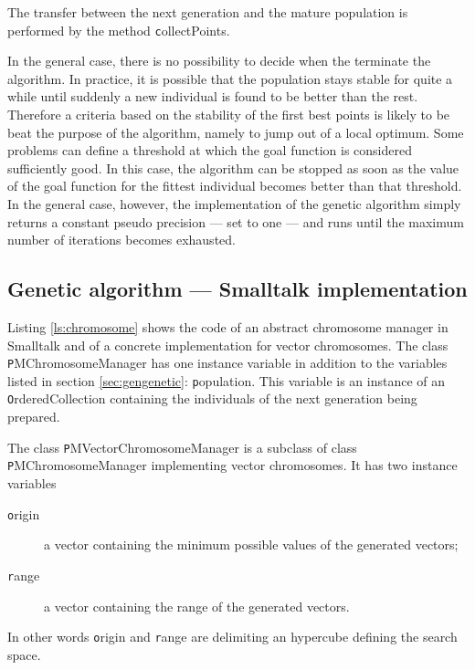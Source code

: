 \noindent The transfer between the next generation and the mature
population is performed by the method {\texttt collectPoints}.

In the general case, there is no possibility to decide when the
terminate the algorithm. In practice, it is possible that the
population stays stable for quite a while until suddenly a new
individual is found to be better than the rest. Therefore a
criteria based on the stability of the first best points is likely
to be beat the purpose of the algorithm, namely to jump out of a
local optimum. Some problems can define a threshold at which the
goal function is considered sufficiently good. In this case, the
algorithm can be stopped as soon as the value of the goal function
for the fittest individual becomes better than that threshold. In
the general case, however, the implementation of the genetic
algorithm simply returns a constant pseudo precision
--- set to one --- and runs until the maximum number of iterations
becomes exhausted.

\subsection{Genetic algorithm --- Smalltalk implementation}
Listing \ref{ls:chromosome} shows the code of an abstract chromosome manager in
Smalltalk and of a concrete implementation for vector chromosomes. The class
{\texttt PMChromosomeManager} has one instance variable in addition
to the variables listed in section \ref{sec:gengenetic}: {\texttt
population}. This variable is an instance of an {\texttt
OrderedCollection} containing the individuals of the next
generation being prepared.

The class {\texttt PMVectorChromosomeManager} is a subclass of class
{\texttt PMChromosomeManager} implementing vector chromosomes. It has
two instance variables
\begin{description}
  \item[\texttt origin] a vector containing the minimum possible
  values of the generated vectors;
  \item[\texttt range] a vector containing the range of the generated
  vectors.
\end{description}
In other words {\texttt origin} and {\texttt range} are delimiting an
hypercube defining the search space.

